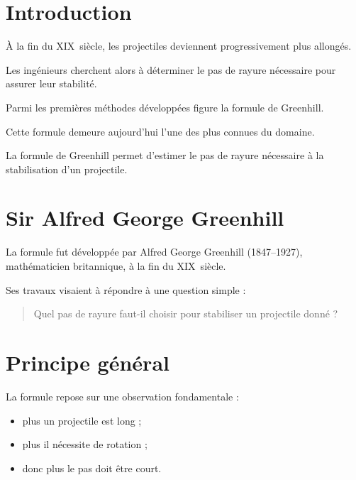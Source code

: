 
\section{Introduction}

À la fin du XIX\ieme\ siècle, les projectiles deviennent progressivement plus
allongés.

Les ingénieurs cherchent alors à déterminer le pas de rayure nécessaire pour
assurer leur stabilité.

Parmi les premières méthodes développées figure la formule de Greenhill.

Cette formule demeure aujourd'hui l'une des plus connues du domaine.

\begin{aretenir}

La formule de Greenhill permet d'estimer le pas de rayure nécessaire à la
stabilisation d'un projectile.

\end{aretenir}

\section{Sir Alfred George Greenhill}

La formule fut développée par Alfred George Greenhill
(1847--1927), mathématicien britannique, à la fin du XIX\ieme\ siècle.

Ses travaux visaient à répondre à une question simple :

\begin{quote}
Quel pas de rayure faut-il choisir pour stabiliser un projectile donné ?
\end{quote}

\section{Principe général}

La formule repose sur une observation fondamentale :

\begin{itemize}
    \item plus un projectile est long ;
    \item plus il nécessite de rotation ;
    \item donc plus le pas doit être court.
\end{itemize}

